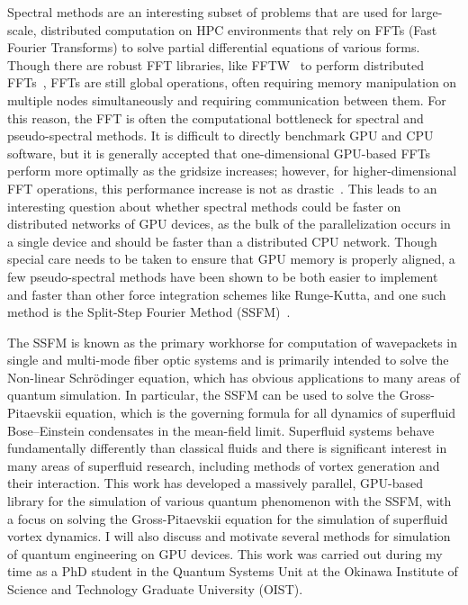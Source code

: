Spectral methods are an interesting subset of problems that are used for large-scale, distributed computation on HPC environments that rely on FFTs (Fast Fourier Transforms) to solve partial differential equations of various forms.
Though there are robust FFT libraries, like FFTW~\cite{frigo1998} to perform distributed FFTs~\cite{popovici2018}, FFTs are still global operations, often requiring memory manipulation on multiple nodes simultaneously and requiring communication between them.
For this reason, the FFT is often the computational bottleneck for spectral and pseudo-spectral methods.
It is difficult to directly benchmark GPU and CPU software, but it is generally accepted that one-dimensional GPU-based FFTs perform more optimally as the gridsize increases; however, for higher-dimensional FFT operations, this performance increase is not as drastic~\cite{merz2016}.
This leads to an interesting question about whether spectral methods could be faster on distributed networks of GPU devices, as the bulk of the parallelization occurs in a single device and should be faster than a distributed CPU network.
Though special care needs to be taken to ensure that GPU memory is properly aligned, a few pseudo-spectral methods have been shown to be both easier to implement and faster than other force integration schemes like Runge-Kutta, and one such method is the Split-Step Fourier Method (SSFM)~\cite{brehler2017}.

The SSFM is known as the primary workhorse for computation of wavepackets in single and multi-mode fiber optic systems and is primarily intended to solve the Non-linear Schr\"odinger equation, which has obvious applications to many areas of quantum simulation.
In particular, the SSFM can be used to solve the Gross-Pitaevskii equation, which is the governing formula for all dynamics of superfluid Bose--Einstein condensates in the mean-field limit.
Superfluid systems behave fundamentally differently than classical fluids and there is significant interest in many areas of superfluid research, including methods of vortex generation and their interaction.
This work has developed a massively parallel, GPU-based library for the simulation of various quantum phenomenon with the SSFM, with a focus on solving the Gross-Pitaevskii equation for the simulation of superfluid vortex dynamics.
I will also discuss and motivate several methods for simulation of quantum engineering on GPU devices.
This work was carried out during my time as a PhD student in the Quantum Systems Unit at the Okinawa Institute of Science and Technology Graduate University (OIST).

